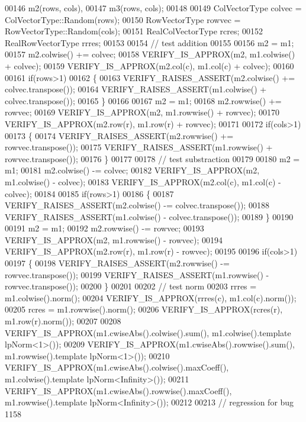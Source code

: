 \begin{DoxyCode}
00146             m2(rows, cols),
00147             m3(rows, cols);
00148 
00149   ColVectorType colvec = ColVectorType::Random(rows);
00150   RowVectorType rowvec = RowVectorType::Random(cols);
00151   RealColVectorType rcres;
00152   RealRowVectorType rrres;
00153 
00154   \textcolor{comment}{// test addition}
00155 
00156   m2 = m1;
00157   m2.colwise() += colvec;
00158   VERIFY\_IS\_APPROX(m2, m1.colwise() + colvec);
00159   VERIFY\_IS\_APPROX(m2.col(c), m1.col(c) + colvec);
00160 
00161   \textcolor{keywordflow}{if}(rows>1)
00162   \{
00163     VERIFY\_RAISES\_ASSERT(m2.colwise() += colvec.transpose());
00164     VERIFY\_RAISES\_ASSERT(m1.colwise() + colvec.transpose());
00165   \}
00166 
00167   m2 = m1;
00168   m2.rowwise() += rowvec;
00169   VERIFY\_IS\_APPROX(m2, m1.rowwise() + rowvec);
00170   VERIFY\_IS\_APPROX(m2.row(r), m1.row(r) + rowvec);
00171 
00172   \textcolor{keywordflow}{if}(cols>1)
00173   \{
00174     VERIFY\_RAISES\_ASSERT(m2.rowwise() += rowvec.transpose());
00175     VERIFY\_RAISES\_ASSERT(m1.rowwise() + rowvec.transpose());
00176   \}
00177 
00178   \textcolor{comment}{// test substraction}
00179 
00180   m2 = m1;
00181   m2.colwise() -= colvec;
00182   VERIFY\_IS\_APPROX(m2, m1.colwise() - colvec);
00183   VERIFY\_IS\_APPROX(m2.col(c), m1.col(c) - colvec);
00184 
00185   \textcolor{keywordflow}{if}(rows>1)
00186   \{
00187     VERIFY\_RAISES\_ASSERT(m2.colwise() -= colvec.transpose());
00188     VERIFY\_RAISES\_ASSERT(m1.colwise() - colvec.transpose());
00189   \}
00190 
00191   m2 = m1;
00192   m2.rowwise() -= rowvec;
00193   VERIFY\_IS\_APPROX(m2, m1.rowwise() - rowvec);
00194   VERIFY\_IS\_APPROX(m2.row(r), m1.row(r) - rowvec);
00195 
00196   \textcolor{keywordflow}{if}(cols>1)
00197   \{
00198     VERIFY\_RAISES\_ASSERT(m2.rowwise() -= rowvec.transpose());
00199     VERIFY\_RAISES\_ASSERT(m1.rowwise() - rowvec.transpose());
00200   \}
00201 
00202   \textcolor{comment}{// test norm}
00203   rrres = m1.colwise().norm();
00204   VERIFY\_IS\_APPROX(rrres(c), m1.col(c).norm());
00205   rcres = m1.rowwise().norm();
00206   VERIFY\_IS\_APPROX(rcres(r), m1.row(r).norm());
00207 
00208   VERIFY\_IS\_APPROX(m1.cwiseAbs().colwise().sum(), m1.colwise().template lpNorm<1>());
00209   VERIFY\_IS\_APPROX(m1.cwiseAbs().rowwise().sum(), m1.rowwise().template lpNorm<1>());
00210   VERIFY\_IS\_APPROX(m1.cwiseAbs().colwise().maxCoeff(), m1.colwise().template lpNorm<Infinity>());
00211   VERIFY\_IS\_APPROX(m1.cwiseAbs().rowwise().maxCoeff(), m1.rowwise().template lpNorm<Infinity>());
00212 
00213   \textcolor{comment}{// regression for bug 1158}

\end{DoxyCode}
